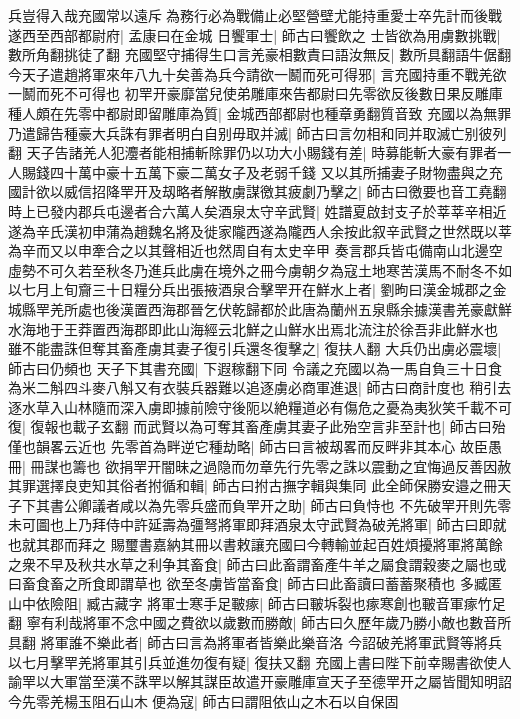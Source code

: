 兵豈得入哉充國常以遠斥為務行必為戰備止必堅營壁尤能持重愛士卒先計而後戰遂西至西部都尉府|{
	孟康曰在金城}
日饗軍士|{
	師古曰饗飲之}
士皆欲為用虜數挑戰|{
	數所角翻挑徒了翻}
充國堅守捕得生口言羌豪相數責曰語汝無反|{
	數所具翻語牛倨翻}
今天子遣趙將軍來年八九十矣善為兵今請欲一鬭而死可得邪|{
	言充國持重不戰羌欲一鬭而死不可得也}
初䍐开豪靡當兒使弟雕庫來告都尉曰先零欲反後數日果反雕庫種人頗在先零中都尉即留雕庫為質|{
	金城西部都尉也種章勇翻質音致}
充國以為無罪乃遣歸告種豪大兵誅有罪者明白自别毋取并滅|{
	師古曰言勿相和同并取滅亡别彼列翻}
天子告諸羌人犯灋者能相捕斬除罪仍以功大小賜錢有差|{
	時募能斬大豪有罪者一人賜錢四十萬中豪十五萬下豪二萬女子及老弱千錢}
又以其所捕妻子財物盡與之充國計欲以威信招降䍐开及刼略者解散虜謀徼其疲劇乃擊之|{
	師古曰徼要也音工堯翻}
時上已發内郡兵屯邊者合六萬人矣酒泉太守辛武賢|{
	姓譜夏啟封支子於莘莘辛相近遂為辛氏漢初申蒲為趙魏名將及徙家隴西遂為隴西人余按此叙辛武賢之世然既以莘為辛而又以申牽合之以其聲相近也然周自有太史辛甲}
奏言郡兵皆屯備南山北邊空虛勢不可久若至秋冬乃進兵此虜在境外之冊今虜朝夕為寇土地寒苦漢馬不耐冬不如以七月上旬齎三十日糧分兵出張掖酒泉合擊䍐开在鮮水上者|{
	劉昫曰漢金城郡之金城縣䍐羌所處也後漢置西海郡晉乞伏乾歸都於此唐為蘭州五泉縣余據漢書羌豪獻鮮水海地于王莽置西海郡即此山海經云北鮮之山鮮水出焉北流注於徐吾非此鮮水也}
雖不能盡誅但奪其畜產虜其妻子復引兵還冬復擊之|{
	復扶人翻}
大兵仍出虜必震壞|{
	師古曰仍頻也}
天子下其書充國|{
	下遐稼翻下同}
令議之充國以為一馬自負三十日食為米二斛四斗麥八斛又有衣裝兵器難以追逐虜必商軍進退|{
	師古曰商計度也}
稍引去逐水草入山林隨而深入虜即據前險守後阨以絶糧道必有傷危之憂為夷狄笑千載不可復|{
	復報也載子玄翻}
而武賢以為可奪其畜產虜其妻子此殆空言非至計也|{
	師古曰殆僅也韻畧云近也}
先零首為畔逆它種劫略|{
	師古曰言被刼畧而反畔非其本心}
故臣愚冊|{
	冊謀也籌也}
欲捐䍐开闇昧之過隐而勿章先行先零之誅以震動之宜悔過反善因赦其罪選擇良吏知其俗者拊循和輯|{
	師古曰拊古撫字輯與集同}
此全師保勝安邉之冊天子下其書公卿議者咸以為先零兵盛而負䍐开之助|{
	師古曰負恃也}
不先破䍐开則先零未可圖也上乃拜侍中許延壽為彊弩將軍即拜酒泉太守武賢為破羌將軍|{
	師古曰即就也就其郡而拜之}
賜璽書嘉納其冊以書敕讓充國曰今轉輸並起百姓煩擾將軍將萬餘之衆不早及秋共水草之利争其畜食|{
	師古曰此畜謂畜產牛羊之屬食謂穀麥之屬也或曰畜食畜之所食即謂草也}
欲至冬虜皆當畜食|{
	師古曰此畜讀曰蓄蓄聚積也}
多臧匿山中依險阻|{
	臧古藏字}
將軍士寒手足皸瘃|{
	師古曰皸坼裂也瘃寒創也皸音軍瘃竹足翻}
寧有利哉將軍不念中國之費欲以歲數而勝敵|{
	師古曰久歷年歲乃勝小敵也數音所具翻}
將軍誰不樂此者|{
	師古曰言為將軍者皆樂此樂音洛}
今詔破羌將軍武賢等將兵以七月擊䍐羌將軍其引兵並進勿復有疑|{
	復扶又翻}
充國上書曰陛下前幸賜書欲使人諭䍐以大軍當至漢不誅䍐以解其謀臣故遣开豪雕庫宣天子至德䍐开之屬皆聞知明詔今先零羌楊玉阻石山木便為寇|{
	師古曰謂阻依山之木石以自保固}
